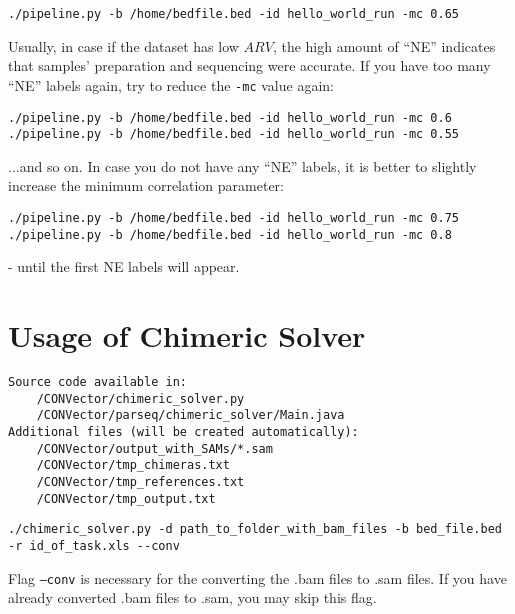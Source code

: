 \documentclass{article}
\begin{document}
\begin{lstlisting}[style=DOS, caption={Run of the package using prepared Matrix of Coverages}]
./pipeline.py -b /home/bedfile.bed -id hello_world_run -mc 0.65
\end{lstlisting}

Usually, in case if the dataset has low $ARV$, the high amount of ``NE'' indicates that samples' preparation and sequencing were accurate. If you have too many ``NE'' labels again, try to reduce the \texttt{-mc} value again:

\begin{lstlisting}[style=DOS, caption={Decreasing of correlation}]
./pipeline.py -b /home/bedfile.bed -id hello_world_run -mc 0.6
./pipeline.py -b /home/bedfile.bed -id hello_world_run -mc 0.55
\end{lstlisting}

...and so on. In case you do not have any ``NE'' labels, it is better to slightly increase the minimum correlation parameter:

\begin{lstlisting}[style=DOS, caption={Increasing of correlation}]
./pipeline.py -b /home/bedfile.bed -id hello_world_run -mc 0.75
./pipeline.py -b /home/bedfile.bed -id hello_world_run -mc 0.8
\end{lstlisting}
- until the first NE labels will appear.







\newpage

\section{Usage of Chimeric Solver}
\begin{verbatim}
Source code available in:
    /CONVector/chimeric_solver.py
    /CONVector/parseq/chimeric_solver/Main.java
Additional files (will be created automatically):
    /CONVector/output_with_SAMs/*.sam
    /CONVector/tmp_chimeras.txt
    /CONVector/tmp_references.txt
    /CONVector/tmp_output.txt
\end{verbatim}

\begin{lstlisting}[style=DOS, caption={Simple run of Chimeric Solver}]
./chimeric_solver.py -d path_to_folder_with_bam_files -b bed_file.bed -r id_of_task.xls --conv
\end{lstlisting}

Flag \texttt{--conv} is necessary for the converting the .bam files to .sam files. If you have already converted .bam files to .sam, you may skip this flag.
\end{document}
